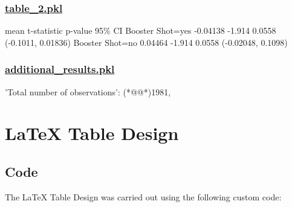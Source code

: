 \documentclass[11pt]{article}
\begin{document}
\subsubsection*{\hyperlink{code-Data Analysis-table-2-pkl}{table\_2.pkl}}

\begin{codeoutput}
                     mean  t-statistic p-value              95\% CI
Booster Shot=yes -0.04138       -1.914  0.0558  (-0.1011, 0.01836)
Booster Shot=no   0.04464       -1.914  0.0558  (-0.02048, 0.1098)
\end{codeoutput}\hypertarget{file-additional-results-pkl}{}

\subsubsection*{\hyperlink{code-Data Analysis-additional-results-pkl}{additional\_results.pkl}}

\begin{codeoutput}
{
    'Total number of observations': (*@@*)1981,
}
\end{codeoutput}

\section{LaTeX Table Design}
\subsection{{Code}}
The LaTeX Table Design was carried out using the following custom code:
\end{document}
